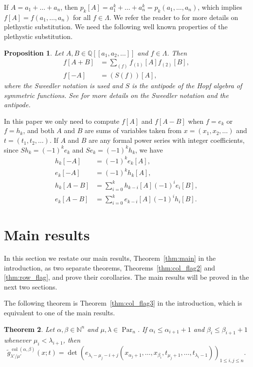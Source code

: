 \documentclass[12pt]{amsart}
\numberwithin{equation}{section}
\newtheorem{thm}{Theorem}[section]
\newtheorem{prop}[thm]{Proposition}
\theoremstyle{definition}
\newcommand\wg{\widetilde{g}}
\newcommand\col{\operatorname{col}}
\newcommand\NN{\mathbb{N}}
\newcommand\Par{\operatorname{Par}}
\begin{document}
If $A=a_1+\dots+a_n$, then $p_k[A]=a_1^k+\dots+a_n^k=p_k(a_1,\dots,a_n)$, which
implies $f[A]=f(a_1,\dots,a_n)$ for all $f\in\Lambda$. We refer the reader to
\cite{Loehr_2010} for more details on plethystic substitution. We need the
following well known properties of the plethystic substitution.


\begin{prop}\label{prop:plethysm}
  Let $A,B\in \mathbb{Q}[[a_1,a_2,\dots]]$ and $f\in \Lambda$.
  Then
\begin{align*}
  f[A+B] &=  \sum_{(f)}f_{(1)}[A] f_{(2)}[B],\\
  f[-A] &= (S(f))[A],
\end{align*}
where the Sweedler notation is used and $S$ is the antipode of the Hopf algebra
of symmetric functions. See \cite{grinberg14:hopf_algeb_combin} for more details
on the Sweedler notation and the antipode.
\end{prop}


In this paper we only need to compute $f[A]$ and $f[A-B]$ when $f=e_k$ or
$f=h_k$, and both $A$ and $B$ are sums of variables taken from
$x=(x_1,x_2,\dots)$ and $t=(t_1,t_2,\dots)$. If $A$ and $B$ are any formal power
series with integer coefficients, since $Sh_k=(-1)^ke_k$ and $Se_k=(-1)^kh_k$,
we have
\begin{align}
  \label{eq:h_k[-A]}
  h_k[-A]&= (-1)^k e_k[A],\\
  \label{eq:e_k[-A]}
  e_k[-A]&= (-1)^k h_k[A],\\
  \label{eq:h_k}
  h_k[A-B]&= \sum_{i=0}^kh_{k-i}[A](-1)^i e_i[B],\\
  \label{eq:e_k}
  e_k[A-B]&= \sum_{i=0}^ke_{k-i}[A](-1)^i h_i[B].
\end{align}




\section{Main results}
\label{sec:main}


In this section we restate our main results, Theorem~\ref{thm:main} in the
introduction, as two separate theorems, Theorems~\ref{thm:col_flag2} and
\ref{thm:row_flag}, and prove their corollaries. The main results will be proved
in the next two sections.

The following theorem is Theorem~\ref{thm:col_flag3} in the introduction, which
is equivalent to one of the main results.


\begin{thm}\label{thm:col_flag}
  Let $\alpha,\beta\in\NN^n$ and $\mu,\lambda\in\Par_n$.
If $\alpha_i\le \alpha_{i+1}+1$ and $\beta_i\le \beta_{i+1}+1$ whenever
$\mu_i<\lambda_{i+1}$, then
\[
\wg_{\lambda'/\mu'}^{\col(\alpha,\beta)}(x;t)  = \det \left(
    e_{\lambda_i-\mu_j-i+j}(x_{\alpha_j+1},\dots, x_{\beta_i},t_{\mu_j+1},\dots,t_{\lambda_i-1})
  \right)_{1\le i,j\le n}.
\]
\end{thm}
\end{document}

